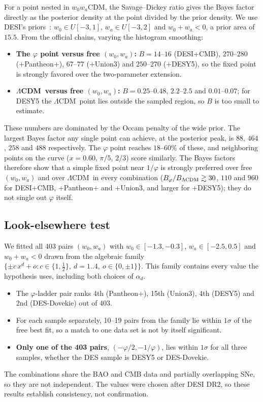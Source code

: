 \documentclass[11pt]{article}
\theoremstyle{definition}
\theoremstyle{remark}
\newcommand{\gr}{\varphi}
\newcommand{\LCDM}{$\Lambda$CDM}
\begin{document}
For a point nested in $w_0w_a$CDM, the Savage--Dickey ratio gives the Bayes factor directly as the posterior density at the point divided by the prior density. We use DESI's priors~\cite{DESI-DR2}: $w_0 \in U[-3, 1]$, $w_a \in U[-3, 2]$ and $w_0 + w_a < 0$, a prior area of $15.5$. From the official chains, varying the histogram smoothing:
\begin{itemize}
\item \textbf{The $\gr$ point versus free $(w_0, w_a)$:} $B = 14$--$16$ (DESI+CMB), $270$--$280$ (+Pantheon+), $67$--$77$ (+Union3) and $250$--$270$ (+DESY5), so the fixed point is strongly favored over the two-parameter extension.
\item \textbf{\LCDM\ versus free $(w_0, w_a)$:} $B = 0.25$--$0.48$, $2.2$--$2.5$ and $0.01$--$0.07$; for DESY5 the \LCDM\ point lies outside the sampled region, so $B$ is too small to estimate.
\end{itemize}
These numbers are dominated by the Occam penalty of the wide prior. The largest Bayes factor any single point can achieve, at the posterior peak, is $88$, $464$, $258$ and $488$ respectively. The $\gr$ point reaches $18$--$60\%$ of these, and neighboring points on the curve ($x = 0.60$, $\pi/5$, $2/3$) score similarly. The Bayes factors therefore show that a simple fixed point near $1/\gr$ is strongly preferred over free $(w_0, w_a)$ and over \LCDM\ in every combination ($B_{\gr}/B_{\Lambda{\rm CDM}} \gtrsim 30$, $110$ and $960$ for DESI+CMB, +Pantheon+ and +Union3, and larger for +DESY5); they do not single out $\gr$ itself.

\subsection{Look-elsewhere test}\label{sec:lee}

We fitted all 403 pairs $(w_0, w_a)$ with $w_0 \in [-1.3, -0.3]$, $w_a \in [-2.5, 0.5]$ and $w_0 + w_a < 0$ drawn from the algebraic family $\{\pm c\,x^d + o : c \in \{1, \tfrac12\},\ d = 1..4,\ o \in \{0, \pm1\}\}$. This family contains every value the hypothesis uses, including both choices of $\alpha_d$.
\begin{itemize}
\item The $\gr$-ladder pair ranks 4th (Pantheon+), 15th (Union3), 4th (DESY5) and 2nd (DES-Dovekie) out of 403.
\item For each sample separately, 10--19 pairs from the family lie within $1\sigma$ of the free best fit, so a match to one data set is not by itself significant.
\item \textbf{Only one of the 403 pairs}, $(-\gr/2, -1/\gr)$, lies within $1\sigma$ for all three samples, whether the DES sample is DESY5 or DES-Dovekie.
\end{itemize}
The combinations share the BAO and CMB data and partially overlapping SNe, so they are not independent. The values were chosen after DESI DR2, so these results establish consistency, not confirmation.
\end{document}

